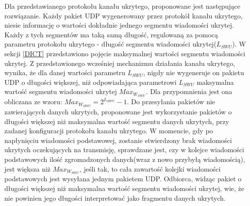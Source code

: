 \documentclass[a4paper, twoside, 12pt]{report}
\begin{document}
    Dla przedstawianego protokołu kanału ukrytego, proponowane jest następujące
    rozwiązanie. Każdy pakiet UDP wygenerowany przez protokół kanału ukrytego,
    niesie informację o wartości dokładnie jednego segmentu wiadomości ukrytej.
    Każdy z tych segmentów ma taką samą długość, regulowaną za pomocą parametru
    protokołu ukrytego - długość segmentu wiadomości ukrytej(\( L_{SWU} \)). W sekcji \ref{DICT}
    przedstawiono pojęcie maksymalnej wartości segmentu wiadomości ukrytej.
    Z przedstawionego wcześniej mechanizmu
    działania kanału ukrytego, wynika, że dla danej wartości parametru \( L_{SWU} \),
    nigdy nie wygeneruje on pakietu UDP o długości większej, niż odpowiadająca parametrowi
    \( L_{SWU} \) maksymalna wartość segmentu wiadomości ukrytej \( Max_{W_{SWU}} \).
    Dla przypomnienia jest ona obliczana ze wzoru:
    \begin{math}
        Max_{W_{SWU}} = 2^{L_{SWU}} - 1
    \end{math}.
    Do przesyłania pakietów nie zawierających danych ukrytych, proponowane jest
    wykorzystanie pakietów o długości większej niż maksymalna wartość segmentu
    danych ukrytych, przy zadanej konfiguracji protokołu kanału ukrytego. W momencie,
    gdy po napłynięciu wiadomości podstawowej, zostanie stwierdzony brak wiadomości
    ukrytych oczekujących na transmisję, sprawdzane jest, czy w kolejce wiadomości
    podstawowych ilość zgromadzonych danych(wraz z nowo przybyłą wiadomością), jest
    większa niż \( Max_{W_{SWU}} \), jeśli tak, to cała zawartość kolejki wiadomości
    podstawowych jest wysyłana jednym pakietem UDP. Odbiorca, widząc pakiet o długości
    większej niż maksymalna wartość segmentu wiadomości ukrytej, wie, że nie powinien
    jego długości interpretować jako fragmentu danych ukrytych.
\end{document}
